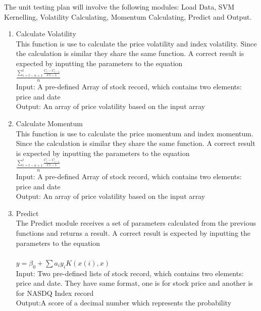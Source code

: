 \documentclass[12pt, titlepage]{article}
\begin{document}
The unit testing plan will involve the following modules: Load Data, SVM Kernelling, Volatility Calculating, Momentum Calculating, Predict and Output.\\
\begin{enumerate}

\item{ Calculate Volatility\\}
This function is use to calculate the price volatility and index volatility. Since the calculation is similar they share the same function. A correct result is expected by inputting the parameters to the equation \\
$\frac{\sum_{i=t-n+1}^{t} \frac{C_i-C_{i-1}}{C{i-1}}}{n}$ \\ 

Input: A pre-defined Array of stock record, which contains two elements: price and date\\
Output: An array of price volatility based on the input array\\


\item{ Calculate Momentum\\}
This function is use to calculate the price momentum and index momentum. Since the calculation is similar they share the same function. A correct result is expected by inputting the parameters to the equation \\
$\frac{\sum_{i=t-n+1}^{t} \frac{C_i-C_{i-1}}{C{i-1}}}{n}$ \\ 

Input: A pre-defined Array of stock record, which contains two elements: price and date\\
Output: An array of price volatility based on the input array\\


\item{Predict \\}
The Predict module receives a set of parameters calculated from the previous functions and returns a result. A correct result is expected by inputting the parameters to the equation \\\\
$y=\beta _0+\sum {a_iy_iK(x(i),x)}$\\
Input: Two pre-defined lists of stock record, which contains two elements: price and date. They have same format, one is for stock price and another is for NASDQ Index record\\
Output:A score of a decimal number which represents the probability\\


\end{enumerate}
\end{document}
